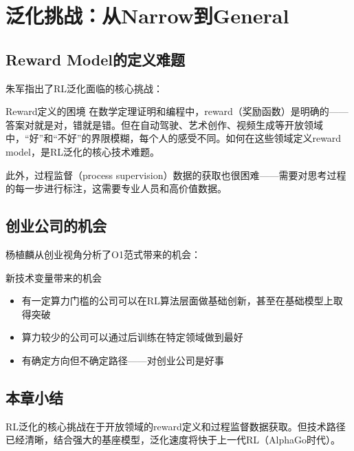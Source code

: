 \section{泛化挑战：从Narrow到General}

\subsection{Reward Model的定义难题}

朱军指出了RL泛化面临的核心挑战：

\begin{warningbox}{Reward定义的困境}
在数学定理证明和编程中，reward（奖励函数）是明确的——答案对就是对，错就是错。但在自动驾驶、艺术创作、视频生成等开放领域中，``好''和``不好''的界限模糊，每个人的感受不同。如何在这些领域定义reward model，是RL泛化的核心技术难题。
\end{warningbox}

此外，过程监督（process supervision）数据的获取也很困难——需要对思考过程的每一步进行标注，这需要专业人员和高价值数据。

\subsection{创业公司的机会}

杨植麟从创业视角分析了O1范式带来的机会：

\begin{knowledgebox}{新技术变量带来的机会}
\begin{itemize}
\item 有一定算力门槛的公司可以在RL算法层面做基础创新，甚至在基础模型上取得突破
\item 算力较少的公司可以通过后训练在特定领域做到最好
\item 有确定方向但不确定路径——对创业公司是好事
\end{itemize}
\end{knowledgebox}

\subsection{本章小结}

RL泛化的核心挑战在于开放领域的reward定义和过程监督数据获取。但技术路径已经清晰，结合强大的基座模型，泛化速度将快于上一代RL（AlphaGo时代）。


